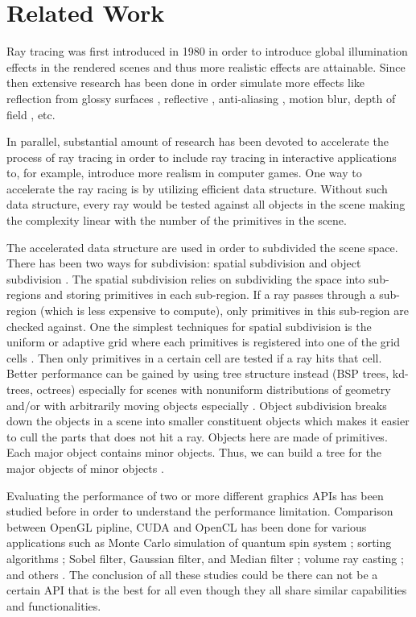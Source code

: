 \section{Related Work}
Ray tracing was first introduced in 1980 \cite{whitted1979improved} in order to introduce global illumination effects in the rendered scenes and thus more realistic effects are attainable. Since then extensive research has been done in order simulate more effects like reflection from glossy surfaces \cite{cook1984distributed, ward1988ray}, reflective \cite{amanatides1984ray}, anti-aliasing \cite{shirley2008realistic,pharr2016physically, cook1984distributed}, motion blur\cite{cook1984distributed, cook1986stochastic}, depth of field \cite{shinya1994post}, etc.

In parallel, substantial amount of research has been devoted to accelerate the process of ray tracing in order to include ray tracing in interactive applications to, for example, introduce more realism in computer games. One way to accelerate the ray racing is by utilizing efficient data structure. Without such data structure, every ray would be tested against all objects in the scene making the complexity linear with the number of the primitives in the scene. 

The accelerated data structure are used in order to subdivided the scene space. There has been two ways for subdivision: spatial subdivision and object subdivision \cite{pharr2016physically}. The spatial subdivision relies on subdividing the space into sub-regions and storing primitives in each sub-region. If a ray passes through a sub-region (which is less expensive to compute), only primitives in this sub-region are checked against. One the simplest techniques for spatial subdivision is the uniform or adaptive grid where each primitives is registered into one of the grid cells \cite{Snyder:1987:RTC:37402.37417}. Then only primitives in a certain cell are tested if a ray hits that cell. Better performance can be gained by using tree structure instead (BSP trees, kd-trees, octrees) especially for scenes with nonuniform distributions of geometry and/or with arbitrarily moving objects especially \cite{foley2005kd}. Object subdivision breaks down the objects in a scene into smaller constituent objects which makes it easier to cull the parts that does not hit a ray. Objects here are made of primitives. Each major object contains minor objects. Thus, we can build a tree for the major objects of minor objects \cite{Kay:1986:RTC:15886.15916}. 

Evaluating the performance of two or more different graphics APIs has been studied before in order to understand the performance limitation. Comparison between OpenGL pipline, CUDA and OpenCL has been done for various applications such as Monte Carlo simulation of quantum spin system \cite{karimi2010performance}; sorting algorithms \cite{5161005}; Sobel filter, Gaussian filter, and Median filter \cite{6419068}; volume ray casting \cite{7833400}; and others \cite{komatsu2010evaluating}. The conclusion of all these studies could be there can not be a certain API that is the best for all even though they all share similar capabilities and functionalities. 